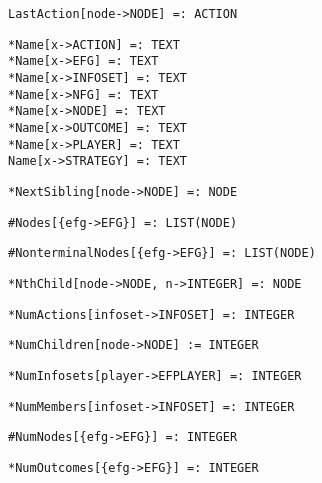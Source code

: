 \protect \large \begin{verbatim} 
LastAction[node->NODE] =: ACTION
\end{verbatim}\normalsize

\protect \large \begin{verbatim}
*Name[x->ACTION] =: TEXT
*Name[x->EFG] =: TEXT
*Name[x->INFOSET] =: TEXT
*Name[x->NFG] =: TEXT
*Name[x->NODE] =: TEXT
*Name[x->OUTCOME] =: TEXT
*Name[x->PLAYER] =: TEXT
Name[x->STRATEGY] =: TEXT
\end{verbatim}\normalsize

\protect \large \begin{verbatim}
*NextSibling[node->NODE] =: NODE
\end{verbatim}\normalsize

\protect \large \begin{verbatim} 
#Nodes[{efg->EFG}] =: LIST(NODE)
\end{verbatim}\normalsize

\protect \large \begin{verbatim} 
#NonterminalNodes[{efg->EFG}] =: LIST(NODE)
\end{verbatim}\normalsize

\protect \large \begin{verbatim} 
*NthChild[node->NODE, n->INTEGER] =: NODE
\end{verbatim}\normalsize

\protect \large \begin{verbatim}
*NumActions[infoset->INFOSET] =: INTEGER
\end{verbatim}\normalsize

\protect \large \begin{verbatim}
*NumChildren[node->NODE] := INTEGER
\end{verbatim}\normalsize

\protect \large \begin{verbatim}
*NumInfosets[player->EFPLAYER] =: INTEGER
\end{verbatim}\normalsize

\protect \large \begin{verbatim}
*NumMembers[infoset->INFOSET] =: INTEGER
\end{verbatim}\normalsize

\protect \large \begin{verbatim}
#NumNodes[{efg->EFG}] =: INTEGER
\end{verbatim}\normalsize

\protect \large \begin{verbatim}
*NumOutcomes[{efg->EFG}] =: INTEGER
\end{verbatim} \normalsize

